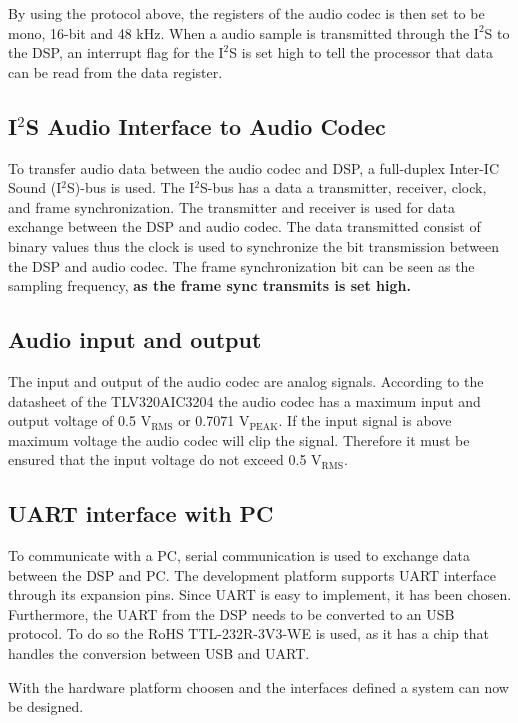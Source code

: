 By using the protocol above, the registers of the audio codec is then set to be mono, 16-bit and 48 kHz. When a audio sample is transmitted through the $\text{I}^2$S to the DSP, an interrupt flag for the $\text{I}^2$S is set high to tell the processor that data can be read from the data register. 

\subsection*{I$^2$S Audio Interface to Audio Codec}

To transfer audio data between the audio codec and DSP, a full-duplex Inter-IC Sound (I$^2$S)-bus is used. The I$^2$S-bus has a data a transmitter, receiver, clock, and frame synchronization. The transmitter and receiver is used for data exchange between the DSP and audio codec. The data transmitted consist of binary values thus the clock is used to synchronize the bit transmission between the DSP and audio codec. The frame synchronization bit can be seen as the sampling frequency, \textbf{as the frame sync transmits is set high.}


\subsection*{Audio input and output}

The input and output of the audio codec are analog signals. According to the datasheet of the TLV320AIC3204 the audio codec has a maximum input and output voltage of 0.5 $\text{V}_\text{RMS}$ or 0.7071 $\text{V}_\text{PEAK}$. If the input signal is above maximum voltage the audio codec will clip the signal. Therefore it must be ensured that the input voltage do not exceed 0.5 $\text{V}_\text{RMS}$. 

\subsection*{UART interface with PC}

To communicate with a PC, serial communication is used to exchange data between the DSP and PC. The development platform supports UART interface through its expansion pins. Since UART is easy to implement, it has been chosen. Furthermore, the UART from the DSP needs to be converted to an USB protocol. To do so the RoHS TTL-232R-3V3-WE is used, as it has a chip that handles the conversion between USB and UART.

With the hardware platform choosen and the interfaces defined a system can now be designed.









